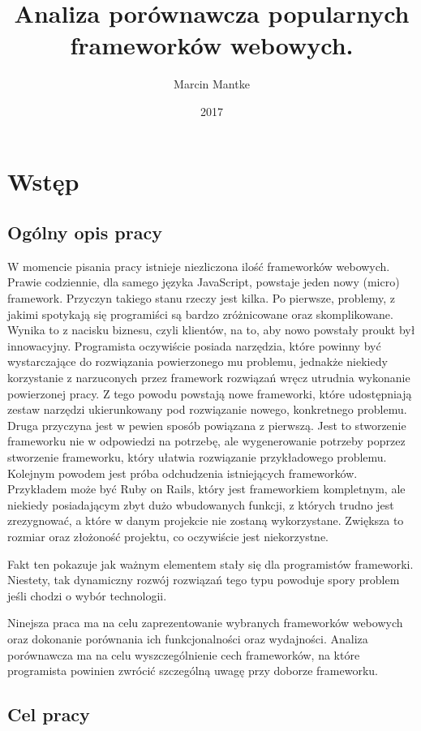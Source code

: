 \documentclass[mgr,oneside]{mgr}
\author{Marcin Mantke}
\title{Analiza porównawcza popularnych frameworków webowych.}
\date{2017}
\begin{document}
\maketitle
\tableofcontents
\chapter{Wstęp}
\section{Ogólny opis pracy}
W momencie pisania pracy istnieje niezliczona ilość frameworków webowych. Prawie codziennie, dla samego języka JavaScript, powstaje jeden nowy (micro) framework. Przyczyn takiego stanu rzeczy jest kilka. Po pierwsze, problemy, z jakimi spotykają się programiści są bardzo zróżnicowane oraz skomplikowane. Wynika to z nacisku biznesu, czyli klientów, na to, aby nowo powstały proukt był innowacyjny. Programista oczywiście posiada narzędzia, które powinny być wystarczające do rozwiązania powierzonego mu problemu, jednakże niekiedy korzystanie z narzuconych przez framework rozwiązań wręcz utrudnia wykonanie powierzonej pracy. Z tego powodu powstają nowe frameworki, które udostępniają zestaw narzędzi ukierunkowany pod rozwiązanie nowego, konkretnego problemu. Druga przyczyna jest w pewien sposób powiązana z pierwszą. Jest to stworzenie frameworku nie w odpowiedzi na potrzebę, ale wygenerowanie potrzeby poprzez stworzenie frameworku, który ułatwia rozwiązanie przykładowego problemu. Kolejnym powodem jest próba odchudzenia istniejących frameworków. Przykładem może być Ruby on Rails, który jest frameworkiem kompletnym, ale niekiedy posiadającym zbyt dużo wbudowanych funkcji, z których trudno jest zrezygnować, a które w danym projekcie nie zostaną wykorzystane. Zwiększa to rozmiar oraz złożoność projektu, co oczywiście jest niekorzystne.

Fakt ten pokazuje jak ważnym elementem stały się dla programistów frameworki. Niestety, tak dynamiczny rozwój rozwiązań tego typu powoduje spory problem jeśli chodzi o wybór technologii.

Ninejsza praca ma na celu zaprezentowanie wybranych frameworków webowych oraz dokonanie porównania ich funkcjonalności oraz wydajności. Analiza porównawcza ma na celu wyszczególnienie cech frameworków, na które programista powinien zwrócić szczególną uwagę przy doborze frameworku.

\section{Cel pracy}
\end{document}
